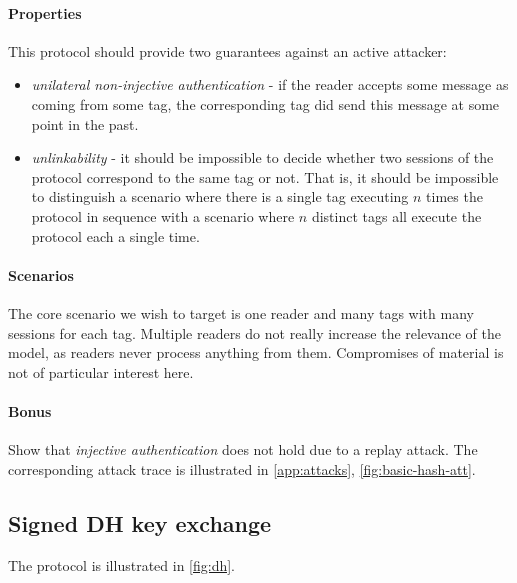 \documentclass[11pt]{article}
\begin{document}
\paragraph{Properties} This protocol should provide two guarantees against an active attacker:
\begin{itemize}
\item \emph{unilateral non-injective authentication} - if the reader accepts some message as coming from some tag, the corresponding tag did send this message at some point in the past.
\item \emph{unlinkability} - it should be impossible to decide whether two sessions of the protocol correspond to the same tag or not. That is, it should be impossible to distinguish a scenario where there is a single tag executing $n$ times the protocol in sequence with a scenario where $n$ distinct tags all execute the protocol each a single time. 
\end{itemize}

\paragraph{Scenarios} The core scenario we wish to target is one reader and many tags with many sessions for each tag. Multiple readers do not really increase the relevance of the model, as readers never process anything from them. Compromises of material is not of particular interest here.

\paragraph{Bonus} Show that \emph{injective authentication} does not hold due to a replay attack. The corresponding attack trace is illustrated in \cref{app:attacks}, \cref{fig:basic-hash-att}.

\subsection{Signed DH key exchange}\label{prob:dh}

The protocol is illustrated in \cref{fig:dh}.
\end{document}
